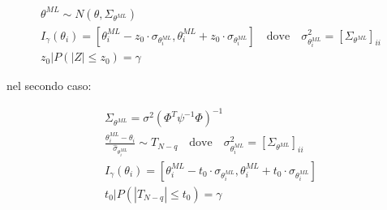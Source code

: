 \begin{gather*}
    \theta^{ML}\sim N(\theta,\Sigma_{\theta^{ML}})\\
    I_\gamma(\theta_i)=\left[ \theta_i^{ML} - z_0\cdot\sigma_{\theta_i^{ML}}  ,  \theta_i^{ML} + z_0\cdot\sigma_{\theta_i^{ML}}\right]\quad \text{dove} \quad \sigma_{\theta_i^{ML}}^2 = \left[ \Sigma_{\theta^{ML}}\right]_{ii}\\
    z_0 | P(\left| Z \right| \leq z_0 ) =\gamma
\end{gather*}

nel secondo caso:

\begin{gather*}
  \Sigma_{\theta^{ML}}=\sigma^2(\Phi^T\psi^{-1}\Phi)^{-1}\\
  \frac{\theta_i^{ML}-\theta_i}{\hat{\sigma}_{\theta_i^{ML}}} \sim T_{N-q}\quad\text{dove}\quad\sigma_{\theta_i^{ML}}^2 = \left[ \Sigma_{\theta^{ML}}\right]_{ii}\\
  I_\gamma(\theta_i)=\left[ \theta_i^{ML} - t_0\cdot\sigma_{\theta_i^{ML}}  ,  \theta_i^{ML} + t_0\cdot\sigma_{\theta_i^{ML}}\right]\\
  t_0 | P(\left| T_{N-q} \right| \leq t_0 ) =\gamma
\end{gather*}



